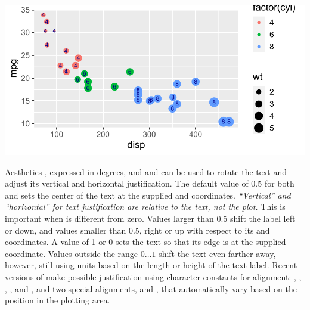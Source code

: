 \documentclass[krantz2]{krantz}\usepackage{knitr}
\begin{document}
\begin{knitrout}\footnotesize
{}\color{fgcolor}\begin{kframe}
\begin{alltt}
\hlstd{(} 
          \hlstd{=} \hlstd{(}   
                        \hlstd{=}      \hlopt{+}
  \hlstd{(} \hlstd{=} \hlopt{/}\hlstd{)} \hlopt{+}
  \hlstd{(} \hlstd{=} \hlstd{,}  \hlstd{=} \hlstd{)}
\end{alltt}
\end{kframe}

{\centering \includegraphics[width=.7\textwidth]{figure/pos-text-plot-01-1} 

}


\end{knitrout}

Aesthetics , expressed in degrees, and  and  can be used to rotate the text and adjust its vertical and horizontal justification. The default value of 0.5 for both  and  sets the center of the text at the supplied  and  coordinates. \emph{``Vertical'' and ``horizontal'' for text justification are relative to the text, not the plot.} This is important when  is different from zero. Values larger than 0.5 shift the label left or down, and values smaller than 0.5, right or up with respect to its  and  coordinates. A value of 1 or 0 sets the text so that its edge is at the supplied coordinate. Values outside the range $0\ldots 1$ shift the text even farther away, however, still using units based on the length or height of the text label. Recent versions of  make possible justification using character constants for alignment: , , , ,  and , and two special alignments,  and , that automatically vary based on the position in the plotting area.
\end{document}
